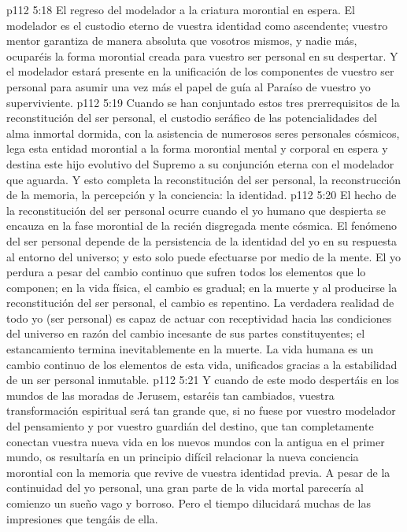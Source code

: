 \vs p112 5:18 El regreso del modelador a la criatura morontial en espera. El modelador es el custodio eterno de vuestra identidad como ascendente; vuestro mentor garantiza de manera absoluta que vosotros mismos, y nadie más, ocuparéis la forma morontial creada para vuestro ser personal en su despertar. Y el modelador estará presente en la unificación de los componentes de vuestro ser personal para asumir una vez más el papel de guía al Paraíso de vuestro yo superviviente.
\vs p112 5:19 Cuando se han conjuntado estos tres prerrequisitos de la reconstitución del ser personal, el custodio seráfico de las potencialidades del alma inmortal dormida, con la asistencia de numerosos seres personales cósmicos, lega esta entidad morontial a la forma morontial mental y corporal en espera y destina este hijo evolutivo del Supremo a su conjunción eterna con el modelador que aguarda. Y esto completa la reconstitución del ser personal, la reconstrucción de la memoria, la percepción y la conciencia: la identidad.
\vs p112 5:20 \pc El hecho de la reconstitución del ser personal ocurre cuando el yo humano que despierta se encauza en la fase morontial de la recién disgregada mente cósmica. El fenómeno del ser personal depende de la persistencia de la identidad del yo en su respuesta al entorno del universo; y esto solo puede efectuarse por medio de la mente. El yo perdura a pesar del cambio continuo que sufren todos los elementos que lo componen; en la vida física, el cambio es gradual; en la muerte y al producirse la reconstitución del ser personal, el cambio es repentino. La verdadera realidad de todo yo (ser personal) es capaz de actuar con receptividad hacia las condiciones del universo en razón del cambio incesante de sus partes constituyentes; el estancamiento termina inevitablemente en la muerte. La vida humana es un cambio continuo de los elementos de esta vida, unificados gracias a la estabilidad de un ser personal inmutable.
\vs p112 5:21 Y cuando de este modo despertáis en los mundos de las moradas de Jerusem, estaréis tan cambiados, vuestra transformación espiritual será tan grande que, si no fuese por vuestro modelador del pensamiento y por vuestro guardián del destino, que tan completamente conectan vuestra nueva vida en los nuevos mundos con la antigua en el primer mundo, os resultaría en un principio difícil relacionar la nueva conciencia morontial con la memoria que revive de vuestra identidad previa. A pesar de la continuidad del yo personal, una gran parte de la vida mortal parecería al comienzo un sueño vago y borroso. Pero el tiempo dilucidará muchas de las impresiones que tengáis de ella.
